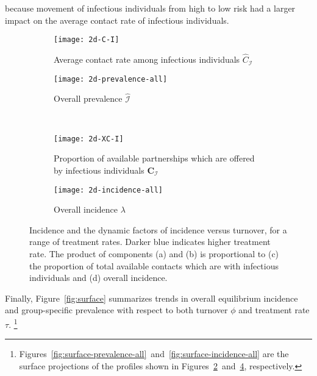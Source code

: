 because movement of infectious individuals from high to low risk
had a larger impact on the average contact rate of infectious individuals.
\begin{figure}[!tbp]
  \centering
  \begin{subfigure}[t]{0.45\linewidth}
    \centering
    \texttt{[image: 2d-C-I]}
    \caption{Average contact rate among infectious individuals $\hat{C}_{\mathcal{I}}$}
    \label{fig:2d-C-I}
  \end{subfigure}
  \begin{subfigure}[t]{0.45\linewidth}
    \centering
    \texttt{[image: 2d-prevalence-all]}
    \caption{Overall prevalence $\hat{\mathcal{I}}$}
    \label{fig:2d-prevalence-all}
  \end{subfigure}\\[1em]
  \begin{subfigure}[t]{0.45\linewidth}
    \centering
    \texttt{[image: 2d-XC-I]}
    \caption{Proportion of available partnerships
      which are offered by infectious individuals $\bm{C}_{\mathcal{I}}$}
    \label{fig:2d-XC-I}
  \end{subfigure}
  \begin{subfigure}[t]{0.45\linewidth}
    \centering
    \texttt{[image: 2d-incidence-all]}
    \caption{Overall incidence $\lambda$}
    \label{fig:2d-incidence-all}
  \end{subfigure}
  \caption{Incidence and the dynamic factors of incidence versus turnover,
    for a range of treatment rates.
    Darker blue indicates higher treatment rate.
    The product of components (a) and (b) is proportional to
    (c) the proportion of total available contacts which are with infectious individuals
    and (d) overall incidence.}
  \label{fig:2d-incidence-factors}
\end{figure}
\par
Finally, Figure~\ref{fig:surface} summarizes trends in
overall equilibrium incidence and group-specific prevalence
with respect to both turnover $\phi$ and treatment rate $\tau$.%
\footnote{Figures~\ref{fig:surface-prevalence-all}~and~\ref{fig:surface-incidence-all}
  are the surface projections of the profiles shown in
  Figures~\ref{fig:2d-prevalence-all}~and~\ref{fig:2d-incidence-all}, respectively.}
